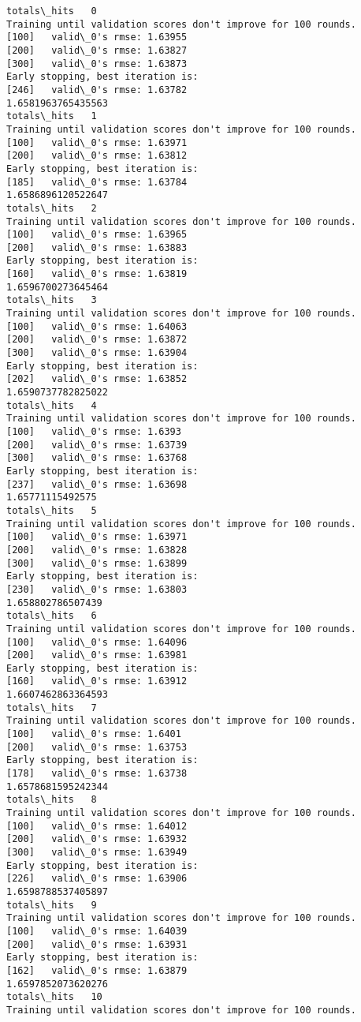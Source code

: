 \documentclass[11pt]{article}
\begin{document}
    \begin{Verbatim}[commandchars=\\\{\}]
totals\_hits   0
Training until validation scores don't improve for 100 rounds.
[100]	valid\_0's rmse: 1.63955
[200]	valid\_0's rmse: 1.63827
[300]	valid\_0's rmse: 1.63873
Early stopping, best iteration is:
[246]	valid\_0's rmse: 1.63782
1.6581963765435563
totals\_hits   1
Training until validation scores don't improve for 100 rounds.
[100]	valid\_0's rmse: 1.63971
[200]	valid\_0's rmse: 1.63812
Early stopping, best iteration is:
[185]	valid\_0's rmse: 1.63784
1.6586896120522647
totals\_hits   2
Training until validation scores don't improve for 100 rounds.
[100]	valid\_0's rmse: 1.63965
[200]	valid\_0's rmse: 1.63883
Early stopping, best iteration is:
[160]	valid\_0's rmse: 1.63819
1.6596700273645464
totals\_hits   3
Training until validation scores don't improve for 100 rounds.
[100]	valid\_0's rmse: 1.64063
[200]	valid\_0's rmse: 1.63872
[300]	valid\_0's rmse: 1.63904
Early stopping, best iteration is:
[202]	valid\_0's rmse: 1.63852
1.6590737782825022
totals\_hits   4
Training until validation scores don't improve for 100 rounds.
[100]	valid\_0's rmse: 1.6393
[200]	valid\_0's rmse: 1.63739
[300]	valid\_0's rmse: 1.63768
Early stopping, best iteration is:
[237]	valid\_0's rmse: 1.63698
1.65771115492575
totals\_hits   5
Training until validation scores don't improve for 100 rounds.
[100]	valid\_0's rmse: 1.63971
[200]	valid\_0's rmse: 1.63828
[300]	valid\_0's rmse: 1.63899
Early stopping, best iteration is:
[230]	valid\_0's rmse: 1.63803
1.658802786507439
totals\_hits   6
Training until validation scores don't improve for 100 rounds.
[100]	valid\_0's rmse: 1.64096
[200]	valid\_0's rmse: 1.63981
Early stopping, best iteration is:
[160]	valid\_0's rmse: 1.63912
1.6607462863364593
totals\_hits   7
Training until validation scores don't improve for 100 rounds.
[100]	valid\_0's rmse: 1.6401
[200]	valid\_0's rmse: 1.63753
Early stopping, best iteration is:
[178]	valid\_0's rmse: 1.63738
1.6578681595242344
totals\_hits   8
Training until validation scores don't improve for 100 rounds.
[100]	valid\_0's rmse: 1.64012
[200]	valid\_0's rmse: 1.63932
[300]	valid\_0's rmse: 1.63949
Early stopping, best iteration is:
[226]	valid\_0's rmse: 1.63906
1.6598788537405897
totals\_hits   9
Training until validation scores don't improve for 100 rounds.
[100]	valid\_0's rmse: 1.64039
[200]	valid\_0's rmse: 1.63931
Early stopping, best iteration is:
[162]	valid\_0's rmse: 1.63879
1.6597852073620276
totals\_hits   10
Training until validation scores don't improve for 100 rounds.

\end{Verbatim}
\end{document}
